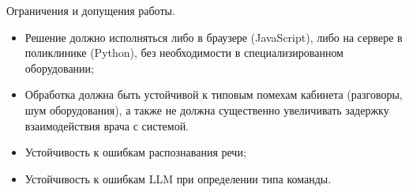 Ограничения и допущения работы.
\begin{itemize}
    \item Решение должно исполняться либо в браузере (JavaScript), либо на сервере в поликлинике (Python), без необходимости в специализированном оборудовании;
    \item Обработка должна быть устойчивой к типовым помехам кабинета (разговоры, шум оборудования), а также не должна существенно увеличивать задержку взаимодействия врача с системой.
    \item Устойчивость к ошибкам распознавания речи;
    \item Устойчивость к ошибкам LLM при определении типа команды.
\end{itemize}
